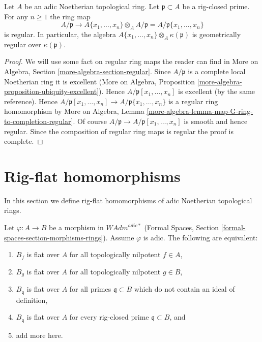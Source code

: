 \begin{lemma}
\label{lemma-fibre-regular}
Let $A$ be an adic Noetherian topological ring.
Let $\mathfrak p \subset A$ be a rig-closed prime.
For any $n \geq 1$ the ring map
$$
A/\mathfrak p
\longrightarrow
A\{x_1, \ldots, x_n\} \otimes_A A/\mathfrak p =
A/\mathfrak p\{x_1, \ldots, x_n\}
$$
is regular. In particular, the algebra
$A\{x_1, \ldots, x_n\} \otimes_A \kappa(\mathfrak p)$
is geometrically regular over $\kappa(\mathfrak p)$.
\end{lemma}

\begin{proof}
We will use some fact on regular ring maps the reader can find
in More on Algebra, Section \ref{more-algebra-section-regular}.
Since $A/\mathfrak p$ is a complete local Noetherian ring it
is excellent (More on Algebra, Proposition
\ref{more-algebra-proposition-ubiquity-excellent}).
Hence $A/\mathfrak p[x_1, \ldots, x_n]$ is excellent
(by the same reference). Hence
$A/\mathfrak p[x_1, \ldots, x_n] \to A/\mathfrak p\{x_1, \ldots, x_n\}$
is a regular ring homomorphism by
More on Algebra, Lemma
\ref{more-algebra-lemma-map-G-ring-to-completion-regular}.
Of course $A/\mathfrak p \to A/\mathfrak p[x_1, \ldots, x_n]$
is smooth and hence regular. Since the composition of regular
ring maps is regular the proof is complete.
\end{proof}







\section{Rig-flat homomorphisms}
\label{section-rig-flat-homomorphisms}

\noindent
In this section we define rig-flat homomorphisms of adic Noetherian
topological rings.

\begin{lemma}
\label{lemma-naively-rig-flat-continuous}
Let $\varphi : A \to B$ be a morphism in $\textit{WAdm}^{adic*}$
(Formal Spaces, Section \ref{formal-spaces-section-morphisms-rings}).
Assume $\varphi$ is adic. The following are equivalent:
\begin{enumerate}
\item $B_f$ is flat over $A$ for all
topologically nilpotent $f \in A$,
\item $B_g$ is flat over $A$ for all
topologically nilpotent $g \in B$,
\item $B_\mathfrak q$ is flat over $A$
for all primes $\mathfrak q \subset B$ which do not contain
an ideal of definition,
\item $B_\mathfrak q$ is flat over $A$ for every rig-closed
prime $\mathfrak q \subset B$, and
\item add more here.
\end{enumerate}
\end{lemma}

